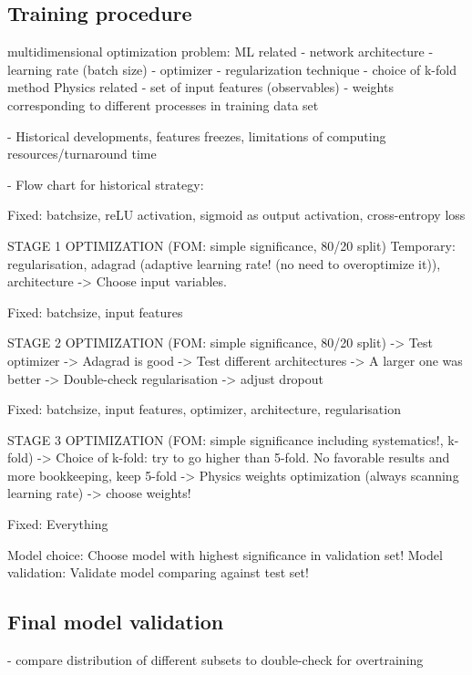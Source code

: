 \subsection{Training procedure}

multidimensional optimization problem:
ML related
- network architecture
- learning rate (batch size)
- optimizer
- regularization technique
- choice of k-fold method
Physics related
- set of input features (observables)
- weights corresponding to different processes in training data set



- Historical developments, features freezes, limitations of computing resources/turnaround time

- Flow chart for historical strategy:

Fixed: batchsize, reLU activation, sigmoid as output activation, cross-entropy loss

STAGE 1 OPTIMIZATION (FOM: simple significance, 80/20 split)
Temporary: regularisation, adagrad (adaptive learning rate! (no need to overoptimize it)), architecture
-> Choose input variables. 

Fixed: batchsize, input features

STAGE 2 OPTIMIZATION (FOM: simple significance, 80/20 split)
-> Test optimizer -> Adagrad is good
-> Test different architectures -> A larger one was better
-> Double-check regularisation -> adjust dropout

Fixed: batchsize, input features, optimizer, architecture, regularisation

STAGE 3 OPTIMIZATION (FOM: simple significance including systematics!, k-fold)
-> Choice of k-fold: try to go higher than 5-fold. No favorable results and more bookkeeping, keep 5-fold
-> Physics weights optimization (always scanning learning rate) -> choose weights!

Fixed: Everything


Model choice: Choose model with highest significance in validation set!
Model validation: Validate model comparing against test set!




\subsection{Final model validation}
- compare distribution of different subsets to double-check for overtraining
